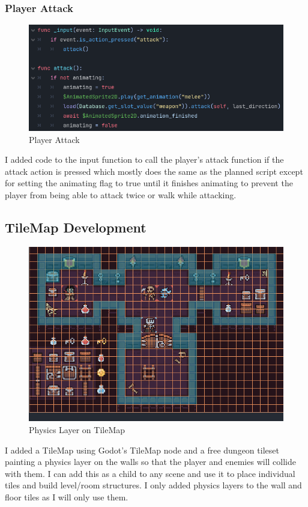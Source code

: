 \documentclass{article}
\begin{document}
        \subsubsection{Player Attack}
        \begin{figure}[H]
                \centering
                \includegraphics[width = 0.8\columnwidth]{images/development/Player_attack.PNG}
                \caption{Player Attack}
        \end{figure}
        I added code to the input function to call the player's attack function if the attack action is pressed which mostly does the same as the planned script except for setting the animating flag to true until it finishes animating to prevent the player from being able to attack twice or walk while attacking.\\
        \subsection{TileMap Development}
        \begin{figure}[H]
                \centering
                \includegraphics[width = 0.9\columnwidth]{images/development/TileMap_physics_layer.PNG}
                \caption{Physics Layer on TileMap}
        \end{figure}
        I added a TileMap using Godot's TileMap node and a free dungeon tileset painting a physics layer on the walls so that the player and enemies will collide with them. I can add this as a child to any scene and use it to place individual tiles and build level/room structures. I only added physics layers to the wall and floor tiles as I will only use them.\\
\end{document}
